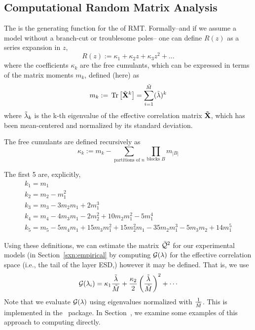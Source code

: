\subsection{Computational Random Matrix Analysis}
\label{sxn:comp_rmt}
The \RTransform is the generating function for the \emph{\FreeCumulants} of RMT.
Formally--and if we assume a model without a branch-cut or troublesome poles--
one can define $R(z)$ as a series expansion in $z$,
\begin{equation}
  \label{eqn:Rz_expansion}
  R(z) := \kappa_1 + \kappa_2 z + \kappa_3 z^2 + \ldots 
\end{equation}
where the coefficients $\kappa_{k}$ are the free cumulants, which can be expressed
in terms of the matrix moments $m_{k}$\cite{potters_bouchaud_2020}, defined (here) as
\begin{equation}
  \label{eqn:mk_defn}
  m_{k}:=\mbox{}\operatorname{Tr}\left[\tilde{\mathbf{X}}^{k}\right]=\sum_{i=1}^{\tilde{M}}(\tilde{\lambda})^{k}
\end{equation}
where $\tilde{\lambda}_{k}$ is the k-th eigenvalue of the effective correlation matrix $\mathbf{\tilde{\mathbf{X}}}$,
which has been mean-centered and normalized by its standard deviation.

The free cumulants are defined recursively as
\begin{equation}
  \label{eqn:kappa_defn}
  \kappa_k := m_k - \sum_{\text{partitions of } n} \prod_{\text{blocks } B} m_{|B|} 
\end{equation}

The first 5 \emph{\Cumulants} are, explicitly,
\begin{align}
  \label{eqn:kappa_defn_2}
  k_1 = m_1 \\ \nonumber
  k_2 = m_2 - m_1^2 \\ \nonumber
  k_3 = m_3 - 3 m_2 m_1 + 2 m_1^3 \\ \nonumber
  k_4 = m_4 - 4 m_3 m_1 - 2 m_2^2 + 10 m_2 m_1^2 - 5 m_1^4 \\ \nonumber 
  k_5 = m_5 - 5 m_4 m_1 + 15 m_3 m_1^2 + 15 m_2^2 m_1 - 35 m_2 m_1^3 - 5 m_3 m_2 + 14 m_1^5
\end{align}

Using these definitions, we can estimate the \LayerQuality matrix $\bar{\mathcal{Q}}^{2}$ for our experimental models
(in Section~\ref{sxn:empirical} by computing $\mathcal{G(\lambda)}$ for the effective correlation space
(i.e., the tail of the layer ESD,) however it may be defined.  That is, we use
\begin{align}
  \label{eqn:G_lambda_series}
\mathcal{G}(\lambda_{i})=\kappa_{1}\frac{\tilde{\lambda}}{\tilde{M}}+\frac{\kappa_{2}}{2}\left(\dfrac{\tilde{\lambda}}{\tilde{M}}\right)^{2}+\cdots
\end{align}
Note that we evaluate $\mathcal{G(\lambda)}$ using eigenvalues normalized with $\tfrac{1}{\tilde{M}}$.
This is implemented in the ~\WW package.
In Section~, we examine some examples of this approach to computing \LayerQualities directly.

